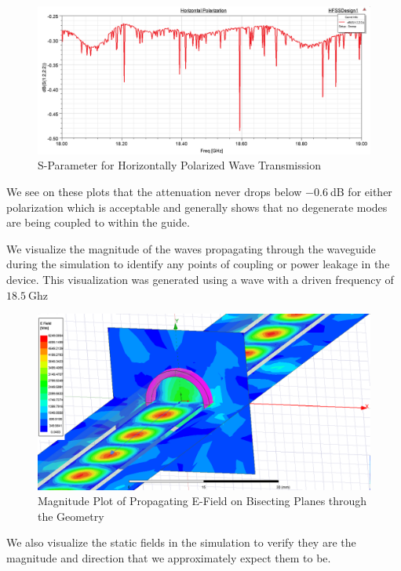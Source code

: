 \documentclass[12pt,letterpaper]{article}
\begin{document}
    \begin{figure}[H]
    \centering
    \includegraphics[width=\linewidth]{img/sparam_horiz.png}
    \caption{S-Parameter for Horizontally Polarized Wave Transmission }
    \end{figure}
    
    
We see on these plots that the attenuation never drops below $-0.6~$dB for either polarization which is acceptable and generally shows that no degenerate modes are being coupled to within the guide. 

We visualize the magnitude of the waves propagating through the waveguide during the simulation to identify any points of coupling or power leakage in the device. This visualization was generated using a wave with a driven frequency of $18.5~$Ghz 

    \begin{figure}[H]
    \centering
    \includegraphics[width=\linewidth]{img/waves.png}
    \caption{Magnitude Plot of Propagating E-Field on Bisecting Planes through the Geometry}
    \end{figure}


We also visualize the static fields in the simulation to verify they are the magnitude and direction that we approximately expect them to be.
\end{document}
